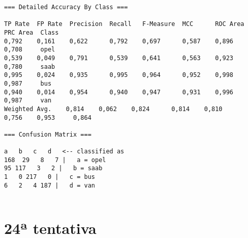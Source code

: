\documentclass[
	article,			%
	11pt,				%
	oneside,			%
	a4paper,			%
	english,			%
	brazil,				%
	sumario=tradicional
	]{abntex2}
\begin{document}
\begin{lstlisting}
=== Detailed Accuracy By Class ===

TP Rate  FP Rate  Precision  Recall   F-Measure  MCC      ROC Area  PRC Area  Class
0,792    0,161    0,622      0,792    0,697      0,587    0,896     0,708     opel
0,539    0,049    0,791      0,539    0,641      0,563    0,923     0,780     saab
0,995    0,024    0,935      0,995    0,964      0,952    0,998     0,987     bus
0,940    0,014    0,954      0,940    0,947      0,931    0,996     0,987     van
Weighted Avg.    0,814    0,062    0,824      0,814    0,810      0,756    0,953     0,864     

=== Confusion Matrix ===

a   b   c   d   <-- classified as
168  29   8   7 |   a = opel
95 117   3   2 |   b = saab
1   0 217   0 |   c = bus
6   2   4 187 |   d = van


\end{lstlisting}

\section{24ª tentativa}
\end{document}

